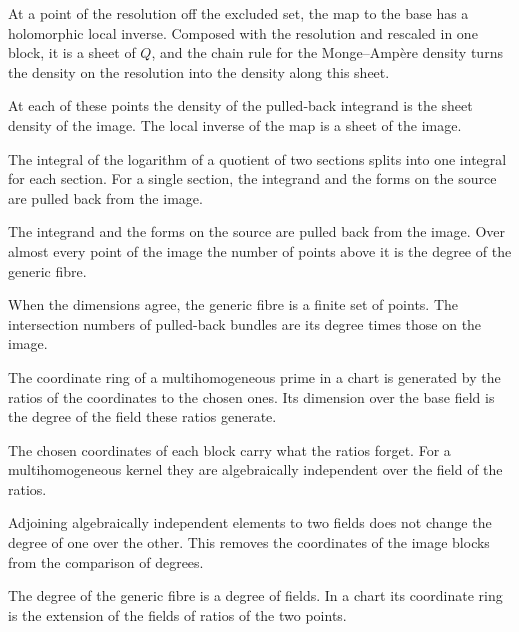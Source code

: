 At a point of the resolution off the excluded set, the map to the base has a holomorphic local inverse. Composed with the
resolution and rescaled in one block, it is a sheet of $Q$, and the chain rule for the Monge--Amp\`ere density turns the
density on the resolution into the density along this sheet.

At each of these points the density of the pulled-back integrand is the sheet density of the image. The local inverse
of the map is a sheet of the image.

The integral of the logarithm of a quotient of two sections splits into one integral for each section. For a single
section, the integrand and the forms on the source are pulled back from the image.

The integrand and the forms on the source are pulled back from the image. Over almost every point of the image the
number of points above it is the degree of the generic fibre.

When the dimensions agree, the generic fibre is a finite set of points. The intersection numbers of pulled-back bundles
are its degree times those on the image.

The coordinate ring of a multihomogeneous prime in a chart is generated by the ratios of the coordinates to the chosen
ones. Its dimension over the base field is the degree of the field these ratios generate.

The chosen coordinates of each block carry what the ratios forget. For a multihomogeneous kernel they are
algebraically independent over the field of the ratios.

Adjoining algebraically independent elements to two fields does not change the degree of one over the other. This
removes the coordinates of the image blocks from the comparison of degrees.

The degree of the generic fibre is a degree of fields. In a chart its coordinate ring is the extension of the fields of
ratios of the two points.

